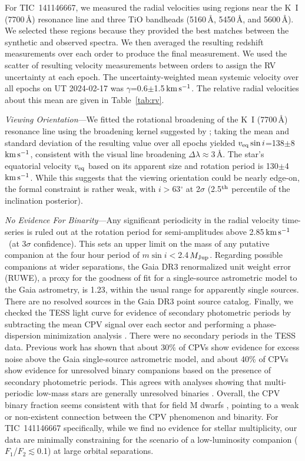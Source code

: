 \documentclass{nature3}
\newcommand{\kms}{\ensuremath{\rm km\,s^{-1}}}
\begin{document}
\begin{methods}
For TIC~141146667, we measured the radial velocities using regions
near the K~I (7700\,\AA) resonance line and three TiO bandheads
(5160\,\AA, 5450\,\AA, and 5600\,\AA).  We
selected these regions because they provided the best matches between the
synthetic and observed spectra.  We then averaged the resulting redshift measurements
over each order to produce the final measurement.  We used
the scatter of resulting velocity measurements between orders to assign
the RV uncertainty at each epoch.  The uncertainty-weighted mean
systemic velocity over all epochs on UT 2024-02-17 was
$\gamma$=0.6$\pm$1.5\,\kms.  The relative radial velocities about this
mean are given in Table~\ref{tab:rv}.

{\it Viewing Orientation}---We fitted the rotational broadening of the
K~I (7700\,\AA) resonance line using the broadening kernel suggested by
\cite{Gray2008}; taking the mean and standard deviation of the
resulting value over all epochs yielded $v_{\rm eq} \sin
i$=138$\pm$8\,\kms, consistent with the visual line broadening $\Delta
\lambda$$\approx$3\,\AA.  The star's equatorial velocity $v_{\rm eq}$
based on its apparent size and rotation period is 130$\pm$4\,\kms.
While this suggests that the viewing orientation could be nearly
edge-on, the formal constraint is rather weak, with $i$$>$63$^\circ$ at
2$\sigma$ (2.5$^{\rm th}$ percentile of the inclination posterior).

{\it No Evidence For Binarity}---Any significant periodicity in the
radial velocity time-series is ruled out at the rotation period for
semi-amplitudes above 2.85\,\kms\ (at 3$\sigma$ confidence).  This
sets an upper limit on the mass of any putative companion at the four
hour period of $m \sin i $$<$2.4\,$M_{\rm Jup}$.  Regarding possible
companions at wider separations, the Gaia DR3 renormalized unit weight
error (RUWE), a proxy for the goodness of fit for a single-source
astrometric model to the Gaia astrometry, is 1.23, within the
usual range for apparently single sources.  There are no resolved
sources in the Gaia DR3 point source catalog.  Finally, we checked the
TESS light curve for evidence of secondary photometric periods by
subtracting the mean CPV signal over each sector and performing a
phase-dispersion minimization analysis
\cite{Stellingwerf1978,2021zndo...1011188B}.  There were no secondary
periods in the TESS data.  Previous work \cite{Bouma2024} has shown
that about 30\% of CPVs show evidence for excess noise above the Gaia
single-source astrometric model, and about 40\% of CPVs show evidence
for unresolved binary companions based on the presence of secondary
photometric periods.  This agrees with analyses showing that
multi-periodic low-mass stars are generally unresolved binaries
\cite{Tokovinin2018}.  Overall, the CPV binary fraction seems
consistent with that for field M dwarfs \cite{Winters2019},
pointing to a weak or non-existent connection between the CPV
phenomenon and binarity.  For TIC~141146667 specifically, while we find 
no evidence for stellar multiplicity, our data are minimally
constraining for the scenario of a low-luminosity companion
($F_1$/$F_2$$\lesssim$0.1) at large orbital separations.



\end{methods}
\end{document}
